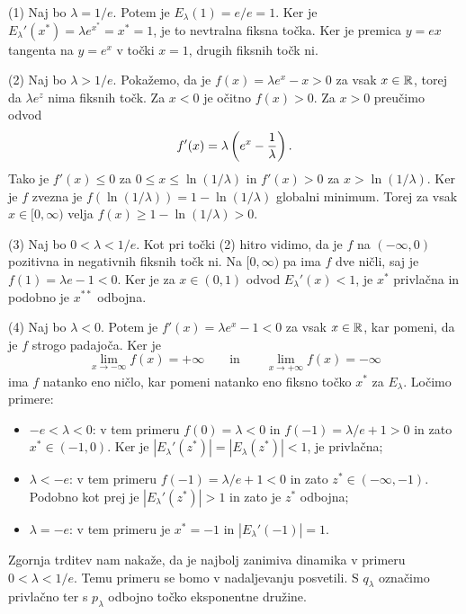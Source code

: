 \begin{dokaz}
    (1) Naj bo \(\lambda = 1/e\). Potem je \(E_\lambda (1) = e/e = 1\). Ker je \(E_\lambda' (x^*) = \lambda e^{x^*} = x^* = 1\), je to nevtralna fiksna točka. Ker je premica \(y = ex\) tangenta na \(y = e^x\) v točki \(x = 1\), drugih fiksnih točk ni.

    (2) Naj bo \(\lambda > 1/e\). Pokažemo, da je \(f (x) = \lambda e^x - x > 0\) za vsak \(x \in \mathbb R\), torej da \(\lambda e^z\) nima fiksnih točk. Za \(x < 0\) je očitno \(f (x) > 0\). Za \(x > 0\) preučimo odvod
    \[f' (x) = \lambda \left( e^x - \frac{1}{\lambda} \right).\]
    Tako je \(f' (x) \leq 0\) za \(0 \leq x \leq \ln (1 / \lambda)\) in \(f' (x) > 0\) za \(x > \ln (1 / \lambda)\). Ker je \(f\) zvezna je \(f (\ln(1/\lambda)) = 1 - \ln (1 / \lambda)\) globalni minimum. Torej za vsak \(x \in [0, \infty)\) velja \(f (x) \geq 1 - \ln (1 / \lambda) > 0\).

    (3) Naj bo \(0 < \lambda < 1/e\). Kot pri točki (2) hitro vidimo, da je \(f\) na \((- \infty, 0)\) pozitivna in negativnih fiksnih točk ni. Na \([0, \infty)\) pa ima \(f\) dve ničli, saj je \(f (1) = \lambda e - 1 < 0\). Ker je za \(x \in (0, 1)\) odvod \(E_\lambda' (x) < 1\), je \(x^*\) privlačna in podobno je \(x^{**}\) odbojna.

    (4) Naj bo \(\lambda < 0\). Potem je \(f' (x) = \lambda e^x - 1 < 0\) za vsak \(x \in \mathbb R\), kar pomeni, da je \(f\) strogo padajoča. Ker je
    \[\lim_{x \to - \infty} f (x) = + \infty \qquad \text{in} \qquad \lim_{x \to + \infty} f (x) = - \infty\]
    ima \(f\) natanko eno ničlo, kar pomeni natanko eno fiksno točko \(x^*\) za \(E_\lambda\). Ločimo primere:
    \begin{itemize}
        \item \(-e < \lambda < 0\): v tem primeru \(f (0) = \lambda < 0\) in \(f (-1) = \lambda / e + 1 > 0\) in zato \(x^* \in (-1, 0)\). Ker je \(|E_\lambda' (z^*)| = |E_\lambda (z^*)| < 1\), je privlačna;
        \item \(\lambda < -e\): v tem primeru \(f (-1) = \lambda / e + 1 < 0\) in zato \(z^* \in (- \infty, -1)\). Podobno kot prej je \(|E_\lambda' (z^*)| > 1\) in zato je \(z^*\) odbojna;
        \item \(\lambda = - e\): v tem primeru je \(x^* = -1\) in \(|E_\lambda' (-1)| = 1\).
    \end{itemize}
\end{dokaz}

\noindent Zgornja trditev nam nakaže, da je najbolj zanimiva dinamika v primeru \(0 < \lambda < 1/e\). Temu primeru se bomo v nadaljevanju posvetili. S \(q_\lambda\) označimo privlačno ter s \(p_\lambda\) odbojno točko eksponentne družine.

